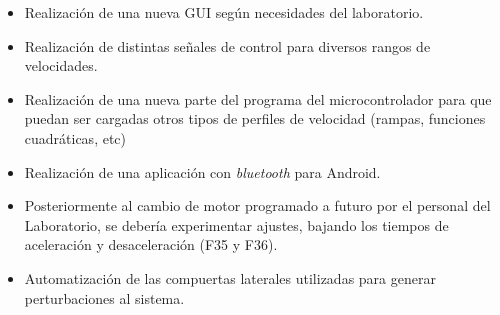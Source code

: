 \begin{itemize}

\item Realización de una nueva GUI según necesidades del laboratorio.
\item Realización de distintas señales de control para diversos rangos de velocidades.
\item Realización de una nueva parte del programa del microcontrolador para que puedan ser cargadas otros tipos de perfiles de velocidad (rampas, funciones cuadráticas, etc)
\item Realización de una aplicación con \textit{bluetooth} para Android.
\item Posteriormente al cambio de motor programado a futuro por el personal del Laboratorio,  se debería experimentar ajustes, bajando los tiempos de aceleración y desaceleración (F35 y F36).
\item Automatización de las compuertas laterales utilizadas para generar perturbaciones al sistema.

\end{itemize}